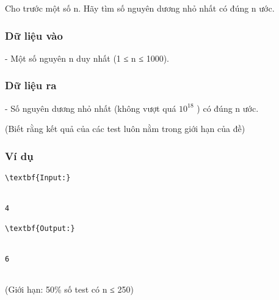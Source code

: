 



   Cho trước một số n. Hãy tìm số nguyên dương nhỏ nhất có đúng n ước.  

\subsubsection{   Dữ liệu vào  }

   - Một số nguyên n duy nhất (1 ≤ n ≤ 1000).  

\subsubsection{   Dữ liệu ra  }

   - Số nguyên dương nhỏ nhất (không vượt quá $10^{18}$   ) có đúng n ước.   


   (Biết rằng kết quả của các test luôn nằm trong giới hạn của đề)  

\subsubsection{   Ví dụ  }


\begin{verbatim}
\textbf{Input:}


4

\textbf{Output:}


6


\end{verbatim}

   (Giới hạn: 50\% số test có n ≤ 250)  
